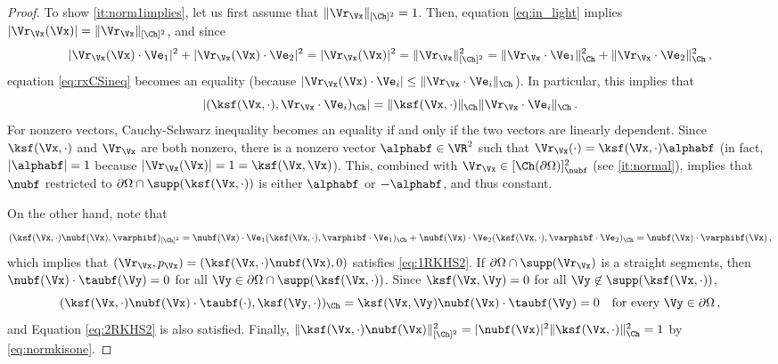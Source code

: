 \documentclass{siamart1116}
\numberwithin{theorem}{section}
\begin{document}
\begin{proof}
To show \cref{it:norm1implies}, let us first assume that $\|\Vr_\Vx\|_{[\Ch]^2}=1$.
Then, equation \cref{eq:in_light} implies $|\Vr_\Vx(\Vx)|=\|\Vr_\Vx\|_{[\Ch]^2}$, and since
\begin{equation*}
|\Vr_\Vx(\Vx)\cdot \Ve_1|^2 + |\Vr_\Vx(\Vx)\cdot \Ve_2|^2
=|\Vr_\Vx(\Vx)|^2=\|\Vr_\Vx\|_{[\Ch]^2}^2= \|\Vr_\Vx\cdot \Ve_1\|_{\Ch}^2 + \|\Vr_\Vx\cdot \Ve_2\|_{\Ch}^2\,,
\end{equation*}
equation \cref{eq:rxCSineq} becomes an equality
(because $|\Vr_\Vx(\Vx)\cdot \Ve_i|  \le  \|\Vr_\Vx\cdot \Ve_i\|_{\Ch}$).
In particular, this implies that
\begin{equation*}
|(\ksf(\Vx,\cdot),\Vr_\Vx\cdot \Ve_i)_{\Ch}|  
=\|\ksf(\Vx,\cdot)\|_{\Ch}  \|\Vr_\Vx\cdot \Ve_i\|_{\Ch}\,.
\end{equation*}
For nonzero vectors, Cauchy-Schwarz inequality becomes an equality 
if and only if the two vectors are linearly dependent.
Since $\ksf(\Vx,\cdot)$ and $\Vr_\Vx$ are both nonzero, there is a nonzero vector
$\alphabf\in\VR^2$ such that $\Vr_\Vx(\cdot) = \ksf(\Vx,\cdot)\alphabf$ (in fact,
$\vert \alphabf \vert = 1$ because $|\Vr_\Vx(\Vx)|=1 = \ksf(\Vx, \Vx)$). This, combined
with $\Vr_\Vx\in[\Ch(\partial \Omega)]^2_{\nubf}$ (see \cref{it:normal}), implies that
$\nubf$ restricted to $\partial \Omega\cap \supp(\ksf(\Vx,\cdot))$ is either $\alphabf$
or $-\alphabf$, and thus constant.

On the other hand, note that
\begin{equation*}(\ksf(\Vx,\cdot)\nubf(\Vx), \varphibf)_{[\Ch]^2} = 
\nubf(\Vx)\cdot\Ve_1(\ksf(\Vx,\cdot), \varphibf\cdot\Ve_1)_{\Ch}
+ \nubf(\Vx)\cdot\Ve_2(\ksf(\Vx,\cdot), \varphibf\cdot\Ve_2)_{\Ch}
= \nubf(\Vx)\cdot \varphibf(\Vx)\,,\end{equation*}
which implies that $(\Vr_\Vx, p_\Vx)  = (\ksf(\Vx,\cdot) \nubf(\Vx), 0)$ satisfies \cref{eq:1RKHS2}.
If $\partial \Omega\cap \supp(\Vr_\Vx)$ is a straight segments,
then $\nubf(\Vx)\cdot\taubf(\Vy)=0$ for all $\Vy\in\partial \Omega\cap \supp(\ksf(\Vx,\cdot))$.
Since $\ksf(\Vx,\Vy)=0$ for all $\Vy\not\in\supp(\ksf(\Vx,\cdot))$,
\begin{equation*}(\ksf(\Vx,\cdot)\nubf(\Vx)\cdot\taubf(\cdot), \ksf(\Vy,\cdot))_\Ch = \ksf(\Vx,\Vy)\nubf(\Vx)\cdot\taubf(\Vy) = 0
\quad \text{for every }\Vy\in\partial\Omega\,,\end{equation*}
and Equation \cref{eq:2RKHS2} is also satisfied.
Finally, $\Vert \ksf(\Vx,\cdot)\nubf(\Vx)\Vert^2_{[\Ch]^2} = 
\vert\nubf(\Vx)\vert^2\Vert\ksf(\Vx,\cdot)\Vert^2_{\Ch} = 1$ by \cref{eq:normkisone}.


\end{proof}
\end{document}
